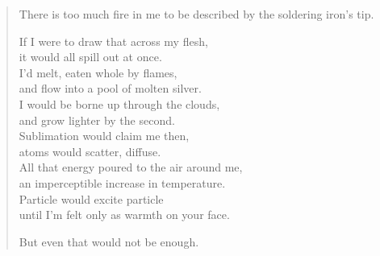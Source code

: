 \begin{verse}
  There is too much fire in me to be described by the soldering iron's tip.

  If I were to draw that across my flesh,\\
  \vin it would all spill out at once.\\
  I'd melt, eaten whole by flames,\\
  \vin and flow into a pool of molten silver.\\
  I would be borne up through the clouds,\\
  \vin and grow lighter by the second.\\
  Sublimation would claim me then,\\
  \vin atoms would scatter, diffuse.\\
  All that energy poured to the air around me,\\
  \vin an imperceptible increase in temperature.\\
  Particle would excite particle\\
  \vin until I'm felt only as warmth on your face.

  But even that would not be enough.
\end{verse}
